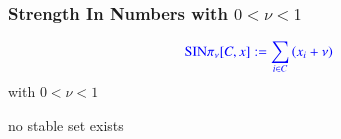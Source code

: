 \documentclass{beamer}
\def\mcolor#1#2{\rule{0ex}{0ex}\color{#1}#2\color{black}{}}
\begin{document}
\begin{frame}
\frametitle{Strength In Numbers with $0<\nu<1$}

\begin{minipage}{0.45\textwidth}
\[\mcolor{blue}{\text{SIN}\pi_\nu[C,x]:=\sum _{i\in C} \left(x_i+\nu \right)} \]
\hspace*{5ex} with \(0<\nu<1\)\bigskip

no stable set exists

\end{minipage}
\begin{minipage}{0.45\textwidth}

  \centering
  
\end{minipage}
\end{frame}


\end{document}

